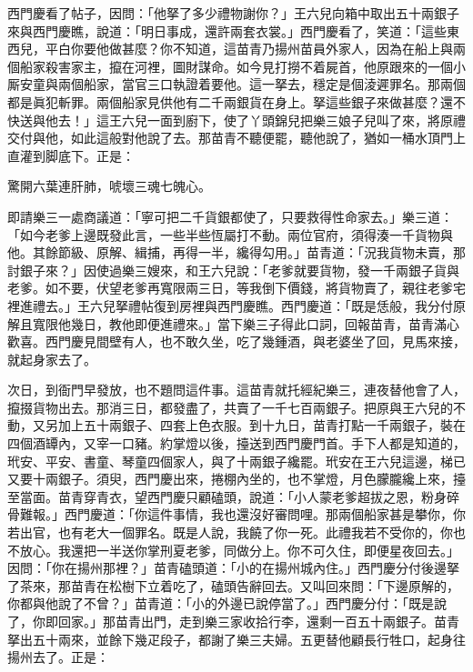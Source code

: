 西門慶看了帖子，因問：「他拏了多少禮物謝你？」王六兒向箱中取出五十兩銀子來與西門慶瞧，說道：「明日事成，還許兩套衣裳。」西門慶看了，笑道：「這些東西兒，平白你要他做甚麼？你不知道，這苗青乃揚州苗員外家人，因為在船上與兩個船家殺害家主，攛在河裡，圖財謀命。如今見打撈不着屍首，他原跟來的一個小厮安童與兩個船家，當官三口執證着要他。這一拏去，穩定是個淩遲罪名。那兩個都是眞犯斬罪。兩個船家見供他有二千兩銀貨在身上。拏這些銀子來做甚麼？還不快送與他去！」這王六兒一面到廚下，使了丫頭錦兒把樂三娘子兒叫了來，將原禮交付與他，如此這般對他說了去。那苗青不聽便罷，聽他說了，猶如一桶水頂門上直灌到脚底下。正是：

\begin{myquote}
驚開六葉連肝肺，唬壞三魂七魄心。
\end{myquote}

即請樂三一處商議道：「寧可把二千貨銀都使了，只要救得性命家去。」樂三道：「如今老爹上邊既發此言，一些半些恆屬打不動。兩位官府，須得湊一千貨物與他。其餘節級、原解、緝捕，再得一半，纔得勾用。」苗青道：「況我貨物未賣，那討銀子來？」因使過樂三嫂來，和王六兒說：「老爹就要貨物，發一千兩銀子貨與老爹。如不要，伏望老爹再寬限兩三日，等我倒下價錢，將貨物賣了，親往老爹宅裡進禮去。」王六兒拏禮帖復到房裡與西門慶瞧。西門慶道：「既是恁般，我分付原解且寬限他幾日，教他即便進禮來。」當下樂三子得此口詞，回報苗青，苗青滿心歡喜。西門慶見間壁有人，也不敢久坐，吃了幾鍾酒，與老婆坐了回，見馬來接，就起身家去了。

次日，到衙門早發放，也不題問這件事。這苗青就托經紀樂三，連夜替他會了人，攛掇貨物出去。那消三日，都發盡了，共賣了一千七百兩銀子。把原與王六兒的不動，又另加上五十兩銀子、四套上色衣服。到十九日，苗青打點一千兩銀子，裝在四個酒罈內，又宰一口豬。約掌燈以後，擡送到西門慶門首。手下人都是知道的，玳安、平安、書童、琴童四個家人，與了十兩銀子纔罷。玳安在王六兒這邊，梯已又要十兩銀子。須臾，西門慶出來，捲棚內坐的，也不掌燈，月色朦朧纔上來，{}擡至當面。苗青穿青衣，望西門慶只顧磕頭，說道：「小人蒙老爹超拔之恩，粉身碎骨難報。」西門慶道：「你這件事情，我也還沒好審問哩。那兩個船家甚是攀你，你若出官，也有老大一個罪名。既是人說，我饒了你一死。此禮我若不受你的，你也不放心。我還把一半送你掌刑夏老爹，同做分上。你不可久住，即便星夜回去。」因問：「你在揚州那裡？」苗青磕頭道：「小的在揚州城內住。」西門慶分付後邊拏了茶來，那苗青在松樹下立着吃了，磕頭告辭回去。又叫回來問：「下邊原解的，你都與他說了不曾？」苗青道：「小的外邊已說停當了。」西門慶分付：「既是說了，你即回家。」那苗青出門，走到樂三家收拾行李，還剩一百五十兩銀子。苗青拏出五十兩來，並餘下幾疋段子，都謝了樂三夫婦。五更替他顧長行牲口，起身往揚州去了。正是：

